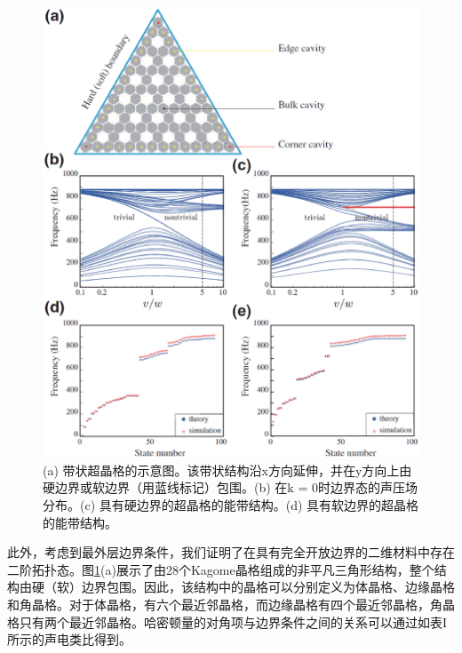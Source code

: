 \begin{figure}[h!]
  \centering
  \includegraphics[width=1\textwidth]{images/fig3-11.eps} 
  \caption{(a) 带状超晶格的示意图。该带状结构沿x方向延伸，并在y方向上由硬边界或软边界（用蓝线标记）包围。(b) 在k = 0时边界态的声压场分布。(c) 具有硬边界的超晶格的能带结构。(d) 具有软边界的超晶格的能带结构。}
  \label{fig_3_11}
\end{figure}


此外，考虑到最外层边界条件，我们证明了在具有完全开放边界的二维材料中存在二阶拓扑态。图\ref{fig_3_11}(a)展示了由28个Kagome晶格组成的非平凡三角形结构，整个结构由硬（软）边界包围。因此，该结构中的晶格可以分别定义为体晶格、边缘晶格和角晶格。对于体晶格，有六个最近邻晶格，而边缘晶格有四个最近邻晶格，角晶格只有两个最近邻晶格。哈密顿量的对角项与边界条件之间的关系可以通过如表I所示的声电类比得到。

